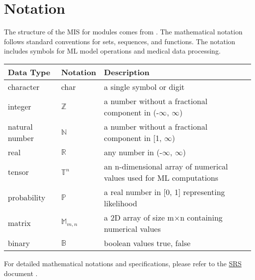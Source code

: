 \documentclass[12pt, titlepage]{article}
\begin{document}
\section{Notation}
The structure of the MIS for modules comes from \citet{HoffmanAndStrooper1995}. The mathematical notation follows standard conventions for sets, sequences, and functions. The notation includes symbols for ML model operations and medical data processing.
\begin{center}
    \renewcommand{\arraystretch}{1.2}
    \noindent 
    \begin{tabular}{l l p{7.5cm}} 
    \toprule 
    \textbf{Data Type} & \textbf{Notation} & \textbf{Description}\\ 
    \midrule
    character & char & a single symbol or digit\\
    integer & $\mathbb{Z}$ & a number without a fractional component in (-$\infty$, $\infty$)\\
    natural number & $\mathbb{N}$ & a number without a fractional component in [1, $\infty$)\\
    real & $\mathbb{R}$ & any number in (-$\infty$, $\infty$)\\
    tensor & $\mathbb{T}^{n}$ & an n-dimensional array of numerical values used for ML computations\\
    probability & $\mathbb{P}$ & a real number in [0, 1] representing likelihood\\
    matrix & $\mathbb{M}_{m,n}$ & a 2D array of size m×n containing numerical values\\
    binary & $\mathbb{B}$ & boolean values {true, false}\\
    \bottomrule
    \end{tabular} 
    \end{center}
    For detailed mathematical notations and specifications, please refer to the \href{https://github.com/RezaJodeiri/CXR-Capstone/blob/main/docs/SRS/SRS.pdf}{SRS} document \citep{SRS}.
\end{document}
